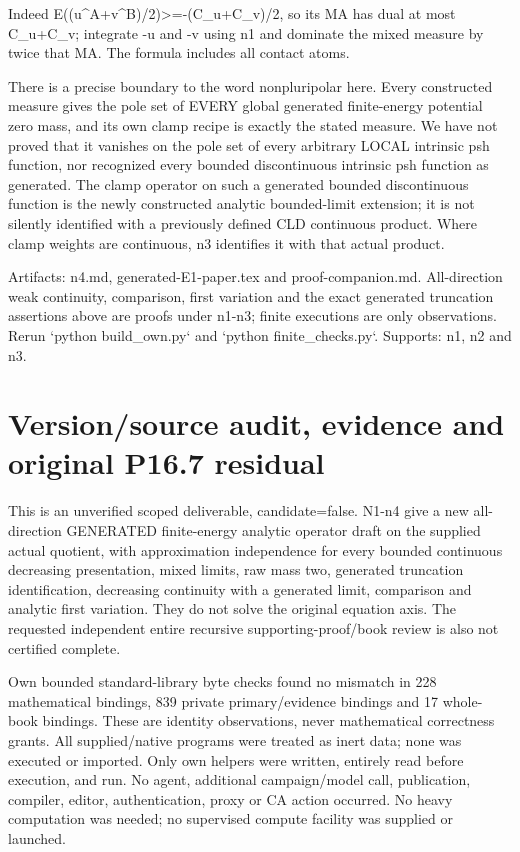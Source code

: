 \documentclass[11pt]{article}
\begin{document}
Indeed E((u\textasciicircum{}A+v\textasciicircum{}B)/2)>=-(C\_u+C\_v)/2, so its MA has dual at most C\_u+C\_v; integrate -u and -v using n1 and dominate the mixed measure by twice that MA. The formula includes all contact atoms.

There is a precise boundary to the word nonpluripolar here. Every constructed measure gives the pole set of EVERY global generated finite-energy potential zero mass, and its own clamp recipe is exactly the stated measure. We have not proved that it vanishes on the pole set of every arbitrary LOCAL intrinsic psh function, nor recognized every bounded discontinuous intrinsic psh function as generated. The clamp operator on such a generated bounded discontinuous function is the newly constructed analytic bounded-limit extension; it is not silently identified with a previously defined CLD continuous product. Where clamp weights are continuous, n3 identifies it with that actual product.

Artifacts: n4.md, generated-E1-paper.tex and proof-companion.md. All-direction weak continuity, comparison, first variation and the exact generated truncation assertions above are proofs under n1-n3; finite executions are only observations. Rerun `python build\_own.py` and `python finite\_checks.py`. Supports: n1, n2 and n3.


\section*{Version/source audit, evidence and original P16.7 residual}

This is an unverified scoped deliverable, candidate=false. N1-n4 give a new all-direction GENERATED finite-energy analytic operator draft on the supplied actual quotient, with approximation independence for every bounded continuous decreasing presentation, mixed limits, raw mass two, generated truncation identification, decreasing continuity with a generated limit, comparison and analytic first variation. They do not solve the original equation axis. The requested independent entire recursive supporting-proof/book review is also not certified complete.

Own bounded standard-library byte checks found no mismatch in 228 mathematical bindings, 839 private primary/evidence bindings and 17 whole-book bindings. These are identity observations, never mathematical correctness grants. All supplied/native programs were treated as inert data; none was executed or imported. Only own helpers were written, entirely read before execution, and run. No agent, additional campaign/model call, publication, compiler, editor, authentication, proxy or CA action occurred. No heavy computation was needed; no supervised compute facility was supplied or launched.
\end{document}
